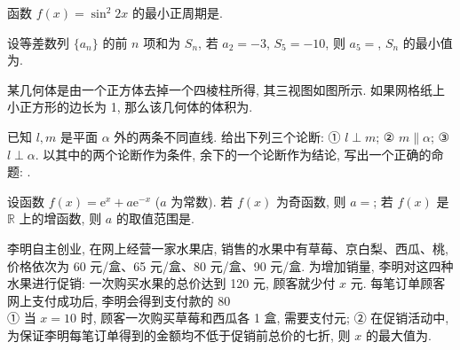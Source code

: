\begin{question}
函数 $f(x) = \sin^2 2x$ 的最小正周期是\gkblank{}.

\end{question}
\begin{question}
设等差数列 $\{a_n\}$ 的前 $n$ 项和为 $S_n$, 若 $a_2 = -3$, $S_5 = -10$, 则 $a_5 =$\gkblank{}, $S_n$ 的最小值为\gkblank{}.

\Needspace{0.4\textheight}
\end{question}
\begin{question}
某几何体是由一个正方体去掉一个四棱柱所得, 其三视图如图所示. 如果网格纸上小正方形的边长为 1, 那么该几何体的体积为\gkblank{}.
\nopagebreak[4]
\begin{center}\end{center}
\nopagebreak[4]
\end{question}
\begin{question}
已知 $l, m$ 是平面 $\alpha$ 外的两条不同直线. 给出下列三个论断:  
① $l \perp m$;  
② $m \parallel \alpha$;  
③ $l \perp \alpha$.  
以其中的两个论断作为条件, 余下的一个论断作为结论, 写出一个正确的命题: \gkblank{}.

\end{question}
\begin{question}
设函数 $f(x) = \mathrm{e}^x + a\mathrm{e}^{-x}$ ($a$ 为常数). 若 $f(x)$ 为奇函数, 则 $a =$\gkblank{}; 若 $f(x)$ 是 $\mathbb{R}$ 上的增函数, 则 $a$ 的取值范围是\gkblank{}.

\end{question}
\begin{question}
李明自主创业, 在网上经营一家水果店, 销售的水果中有草莓、京白梨、西瓜、桃, 价格依次为 60 元/盒、65 元/盒、80 元/盒、90 元/盒. 为增加销量, 李明对这四种水果进行促销: 一次购买水果的总价达到 120 元, 顾客就少付 $x$ 元. 每笔订单顾客网上支付成功后, 李明会得到支付款的 80\\%
① 当 $x = 10$ 时, 顾客一次购买草莓和西瓜各 1 盒, 需要支付\gkblank{}元;  
② 在促销活动中, 为保证李明每笔订单得到的金额均不低于促销前总价的七折, 则 $x$ 的最大值为\gkblank{}.

\par\medskip

\end{question}

